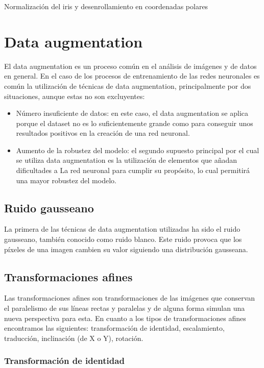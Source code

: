 Normalización del iris y desenrollamiento en coordenadas polares


\section{Data augmentation}

El data augmentation es un proceso común en el análisis de imágenes y de datos en general. En el caso de los procesos de entrenamiento de las redes neuronales es común
la utilización de técnicas de data augmentation, principalmente por dos situaciones, aunque estas no son excluyentes:

\begin{itemize}
	\item Número insuficiente de datos: en este caso, el data augmentation se aplica porque el dataset no es lo suficientemente grande como para conseguir unos resultados 
positivos en la creación de una red neuronal.
	\item Aumento de la robustez del modelo: el segundo supuesto principal por el cual se utiliza data augmentation es la utilización de elementos que añadan dificultades a La
red neuronal para cumplir su propósito, lo cual permitirá una mayor robustez del modelo.
\end{itemize}

\subsection{Ruido gausseano}

La primera de las técnicas de data augmentation utilizadas ha sido el ruido gausseano, también conocido como ruido blanco. Este ruido provoca que los píxeles de una imagen cambien
su valor siguiendo una distribución gausseana.

\subsection{Transformaciones afines}

Las transformaciones afines son transformaciones de las imágenes que conservan el paralelismo de sus líneas rectas y paralelas y de alguna forma simulan una nueva perspectiva para esta.
En cuanto a los tipos de transformaciones afines encontramos las siguientes: transformación de identidad, escalamiento, traducción, inclinación (de X o Y), rotación.

\subsubsection{Transformación de identidad}

